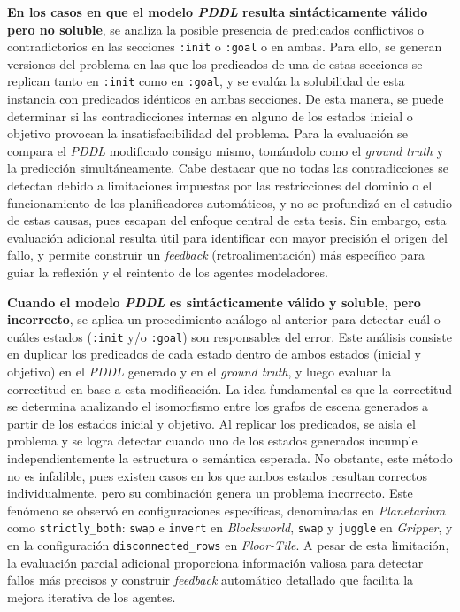 \textbf{En los casos en que el modelo \textit{PDDL} resulta sintácticamente válido pero no soluble}, se analiza la posible presencia de predicados conflictivos o contradictorios en las secciones \texttt{:init} o \texttt{:goal} o en ambas. Para ello, se generan versiones del problema en las que los predicados de una de estas secciones se replican tanto en \texttt{:init} como en \texttt{:goal}, y se evalúa la solubilidad de esta instancia con predicados idénticos en ambas secciones. De esta manera, se puede determinar si las contradicciones internas en alguno de los estados inicial o objetivo provocan la insatisfacibilidad del problema. Para la evaluación se compara el \textit{PDDL} modificado consigo mismo, tomándolo como el \textit{ground truth} y la predicción simultáneamente. Cabe destacar que no todas las contradicciones se detectan debido a limitaciones impuestas por las restricciones del dominio o el funcionamiento de los planificadores automáticos, y no se profundizó en el estudio de estas causas, pues escapan del enfoque central de esta tesis. Sin embargo, esta evaluación adicional resulta útil para identificar con mayor precisión el origen del fallo, y permite construir un \textit{feedback} (retroalimentación) más específico para guiar la reflexión y el reintento de los agentes modeladores.

\textbf{Cuando el modelo \textit{PDDL} es sintácticamente válido y soluble, pero incorrecto}, se aplica un procedimiento análogo al anterior para detectar cuál o cuáles estados (\texttt{:init} y/o \texttt{:goal}) son responsables del error. Este análisis consiste en duplicar los predicados de cada estado dentro de ambos estados (inicial y objetivo) en el \textit{PDDL} generado y en el \textit{ground truth}, y luego evaluar la correctitud en base a esta modificación. La idea fundamental es que la correctitud se determina analizando el isomorfismo entre los grafos de escena generados a partir de los estados inicial y objetivo. Al replicar los predicados, se aisla el problema y se logra detectar cuando uno de los estados generados incumple independientemente la estructura o semántica esperada. No obstante, este método no es infalible, pues existen casos en los que ambos estados resultan correctos individualmente, pero su combinación genera un problema incorrecto. Este fenómeno se observó en configuraciones específicas, denominadas en \textit{Planetarium} como \texttt{strictly\_both}: \texttt{swap} e \texttt{invert} en \textit{Blocksworld}, \texttt{swap} y \texttt{juggle} en \textit{Gripper}, y en la configuración \texttt{disconnected\_rows} en \textit{Floor-Tile}. A pesar de esta limitación, la evaluación parcial adicional proporciona información valiosa para detectar fallos más precisos y construir \textit{feedback} automático detallado que facilita la mejora iterativa de los agentes.

